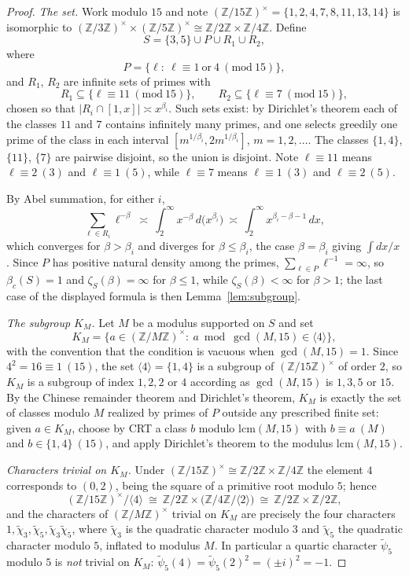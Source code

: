 \documentclass[11pt]{amsart}
\numberwithin{equation}{section}
\theoremstyle{definition}
\theoremstyle{remark}
\newcommand{\Z}{\mathbb{Z}}
\begin{document}
\begin{proof}
\emph{The set.} Work modulo $15$ and note $(\Z/15\Z)^\times=\{1,2,4,7,8,11,13,14\}$
is isomorphic to $(\Z/3\Z)^\times\times(\Z/5\Z)^\times\cong\Z/2\Z\times\Z/4\Z$.
Define
\[
S=\{3,5\}\cup P\cup R_1\cup R_2,
\]
where
\[
P=\{\ell:\ \ell\equiv1\ \text{or}\ 4\ (\mathrm{mod}\ 15)\},
\]
and $R_1$, $R_2$ are infinite sets of primes with
\[
R_1\subseteq\{\ell\equiv11\ (\mathrm{mod}\ 15)\},\qquad
R_2\subseteq\{\ell\equiv7\ (\mathrm{mod}\ 15)\},
\]
chosen so that $|R_i\cap[1,x]|\asymp x^{\beta_i}$. Such sets exist: by
Dirichlet's theorem each of the classes $11$ and $7$ contains infinitely many
primes, and one selects greedily one prime of the class in each interval
$[m^{1/\beta_i},2m^{1/\beta_i}]$, $m=1,2,\dots$. The classes $\{1,4\}$,
$\{11\}$, $\{7\}$ are pairwise disjoint, so the union is disjoint. Note
$\ell\equiv11$ means $\ell\equiv2\ (3)$ and $\ell\equiv1\ (5)$, while
$\ell\equiv7$ means $\ell\equiv1\ (3)$ and $\ell\equiv2\ (5)$.

By Abel summation, for either $i$,
\begin{equation}\label{eq:Rconv}
\sum_{\ell\in R_i}\ell^{-\beta}\ \asymp\ \int_2^\infty x^{-\beta}\,d\bigl(x^{\beta_i}\bigr)
\ \asymp\ \int_2^\infty x^{\beta_i-\beta-1}\,dx,
\end{equation}
which converges for $\beta>\beta_i$ and diverges for $\beta\le\beta_i$, the
case $\beta=\beta_i$ giving $\int dx/x$. Since $P$ has positive natural density
among the primes, $\sum_{\ell\in P}\ell^{-1}=\infty$, so $\beta_c(S)=1$ and
$\zeta_S(\beta)=\infty$ for $\beta\le1$, while $\zeta_S(\beta)<\infty$ for
$\beta>1$; the last case of the displayed formula is then
Lemma~\ref{lem:subgroup}.

\emph{The subgroup $K_M$.} Let $M$ be a modulus supported on $S$ and set
\[
K_M=\bigl\{a\in(\Z/M\Z)^\times:\ a\bmod\gcd(M,15)\in\langle4\rangle\bigr\},
\]
with the convention that the condition is vacuous when $\gcd(M,15)=1$. Since
$4^2=16\equiv1\ (15)$, the set $\langle4\rangle=\{1,4\}$ is a subgroup of
$(\Z/15\Z)^\times$ of order $2$, so $K_M$ is a subgroup of index
$1,2,2$ or $4$ according as $\gcd(M,15)$ is $1,3,5$ or $15$. By the Chinese
remainder theorem and Dirichlet's theorem, $K_M$ is exactly the set of classes
modulo $M$ realized by primes of $P$ outside any prescribed finite set: given
$a\in K_M$, choose by CRT a class $b$ modulo $\mathrm{lcm}(M,15)$ with
$b\equiv a\ (M)$ and $b\in\{1,4\}\ (15)$, and apply Dirichlet's theorem to the
modulus $\mathrm{lcm}(M,15)$.

\emph{Characters trivial on $K_M$.} Under
$(\Z/15\Z)^\times\cong\Z/2\Z\times\Z/4\Z$ the element $4$ corresponds to
$(0,2)$, being the square of a primitive root modulo $5$; hence
\[
(\Z/15\Z)^\times/\langle4\rangle\ \cong\ \Z/2\Z\times\bigl(\Z/4\Z\big/\langle2\rangle\bigr)\ \cong\ \Z/2\Z\times\Z/2\Z,
\]
and the characters of $(\Z/M\Z)^\times$ trivial on $K_M$ are precisely the four
characters $1,\tilde\chi_3,\tilde\chi_5,\tilde\chi_3\tilde\chi_5$, where
$\tilde\chi_3$ is the quadratic character modulo $3$ and $\tilde\chi_5$ the
quadratic character modulo $5$, inflated to modulus $M$. In particular a
quartic character $\tilde\psi_5$ modulo $5$ is \emph{not} trivial on $K_M$:
$\tilde\psi_5(4)=\tilde\psi_5(2)^2=(\pm i)^2=-1$.


\end{proof}
\end{document}
